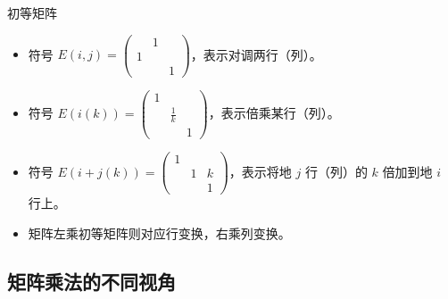初等矩阵
\begin{itemize}
	\item 符号 $E(i,j) = \begin{pmatrix}
			       & 1 & \\ 1 &  & \\ & & 1
		      \end{pmatrix}$，表示对调两行（列）。
	\item 符号 $E(i(k)) = \begin{pmatrix}
			      1 &  & \\  & \frac{1}{k} & \\ & & 1
		      \end{pmatrix}$，表示倍乘某行（列）。
	\item 符号 $E(i+j(k)) = \begin{pmatrix}
			      1 &  & \\  &1 & k \\ & & 1
		      \end{pmatrix}$，表示将地 $j$ 行（列）的 $k$ 倍加到地 $i$ 行上。
	\item 矩阵左乘初等矩阵则对应行变换，右乘列变换。
\end{itemize}

\subsection{矩阵乘法的不同视角}

